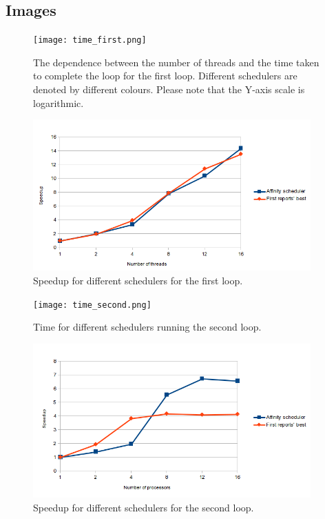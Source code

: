 \documentclass[11pt,a4paper]{article}
\begin{document}
\newpage
\begin{appendices}
\section{Images}
\label{app:images}

\begin{figure}[h!]
    \centering
    \texttt{[image: time\_first.png]}
    \caption{The dependence between the number of threads and the time taken to complete the loop for the first loop. Different schedulers are denoted by different colours. Please note that the Y-axis scale is logarithmic.}\label{img:time_first}
\end{figure}

\begin{figure}[h!]
    \centering
    \includegraphics[width=0.95\textwidth]{affinity_vs_best_first.png}
    \caption{Speedup for different schedulers for the first loop.}\label{img:spd_first}
\end{figure}

\begin{figure}[h!]
    \centering
    \texttt{[image: time\_second.png]}
    \caption{Time for different schedulers running the second loop.}\label{img:time_second}
\end{figure}

\begin{figure}[h!]
    \centering
    \includegraphics[width=0.95\textwidth]{affinity_vs_best_second.png}
    \caption{Speedup for different schedulers for the second loop.}\label{img:spd_second}
\end{figure}



\end{appendices}
\end{document}
